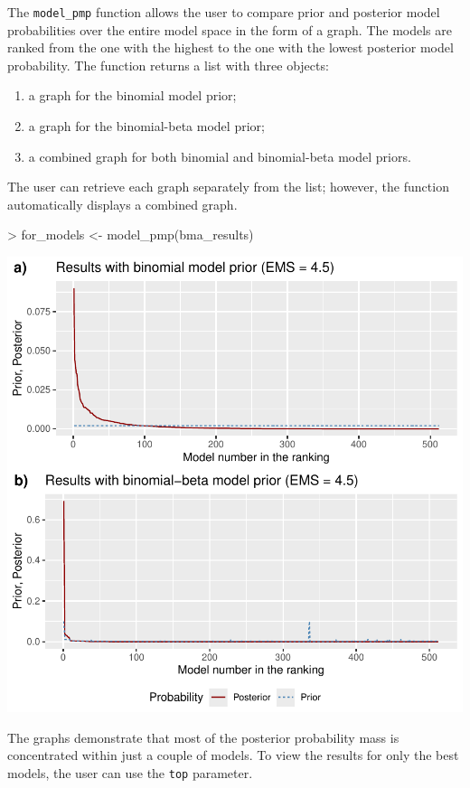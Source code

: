 \documentclass[a4paper]{article}
\begin{document}
The \verb+model_pmp+ function allows the user to compare prior and posterior model probabilities over the entire model space in the form of a graph.
The models are ranked from the one with the highest to the one with the lowest posterior model probability.
The function returns a list with three objects:
\begin{enumerate}
    \item a graph for the binomial model prior;
    \item a graph for the binomial-beta model prior;
    \item a combined graph for both binomial and binomial-beta model priors.
\end{enumerate}
The user can retrieve each graph separately from the list; however, the function automatically displays a combined graph.

\begin{Schunk}
\begin{Sinput}
> for_models <- model_pmp(bma_results)
\end{Sinput}
\end{Schunk}
\includegraphics{bdsm_vignette-014}

The graphs demonstrate that most of the posterior probability mass is concentrated within just a couple of models.
To view the results for only the best models, the user can use the \verb+top+ parameter.
\end{document}
